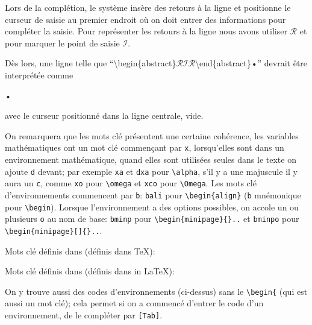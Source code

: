 \newcommand{\AutoCompRet}{$\mathcal{R}$}
\newcommand{\AutoCompIns}{$\mathcal{I}$}
Lors de la complétion, le système insère des retours à la ligne et positionne le curseur de saisie au premier endroit où on doit entrer des informations pour compléter la saisie. Pour représenter les retours à la ligne nous avons utiliser \AutoCompRet{} et pour marquer le point de saisie \AutoCompIns.

Dès lors, une ligne telle que ``\textbackslash begin\{abstract\}{\AutoCompRet}{\AutoCompIns}{\AutoCompRet}\textbackslash end\{abstract\}•'' devrait être interprétée comme
\begin{verbExample}
\begin{abstract}

\end{abstract}•
\end{verbExample}
avec le curseur positionné dans la ligne centrale, vide.

On remarquera que les mots clé présentent une certaine cohérence, les variables mathématiques ont un mot clé commençant par \verb|x|, lorsqu'elles sont dans un environnement mathématique, quand elles sont utilisées seules dans le texte on ajoute \verb|d| devant; par exemple \verb|xa| et \verb|dxa| pour \verb|\alpha|, s'il y a une majuscule il y aura un \verb|c|, comme  \verb|xo| pour
\verb|\omega| et \verb|xco| pour \verb|\Omega|. Les mots clé d'environnements commencent par \verb|b|: \verb|bali| pour
\verb|\begin{align}| (\verb|b| mnémonique pour \verb|\begin|). Lorsque l'environnement a des options possibles, on accole un ou plusieurs \verb|o| au nom de base: \verb|bminp| pour \verb|\begin{minipage}{}..| et 
\verb|bminpo| pour \verb|\begin{minipage}[]{}..|.

%
Mots clé définis dans  (définis dans \TeX):
%


Mots clé définis dans  (définis dans in \LaTeX):
%


On y trouve aussi des codes d'environnements (ci-dessus) sans le \verb|\begin{| (qui est aussi un mot clé); cela permet si on a commencé d'entrer le code d'un environnement, de le compléter par \verb|[Tab]|.
